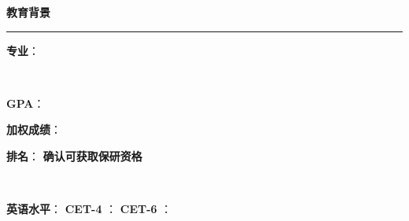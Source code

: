\documentclass[10pt, a4paper, oneside]{ctexart}
\begin{document}
\ifdefined\educationBackground
\begin{minipage}{1\textwidth}
    \large{\ifdefined\showIcon \makebox[\iconAlignWide][c]{\faGraduationCap} \fi \textbf{教育背景}}
\end{minipage}
\rule{\linewidth}{\lineSize}
\begin{center}
    \begin{minipage}{0.9\textwidth}
        \begin{minipage}{0.6\linewidth}
            \university
            \hspace{2em}
            \textbf{\level}
            \hfil
        \end{minipage}
        \begin{minipage}{0.3\linewidth}
            \raggedright
            \textbf{专业}： \major
            \hfil
        \end{minipage} \\[0.5em]
        \begin{minipage}{0.2\linewidth}
            \textbf{GPA}： \gpa \hfil
        \end{minipage}
        \begin{minipage}{0.2\linewidth}
            \textbf{加权成绩}： \grade \hfil
        \end{minipage}
        \begin{minipage}{0.5\linewidth}
            \raggedright
            \textbf{排名}： \rank \ifdefined\qualified \hspace{2em} \textbf{确认可获取保研资格} \fi  \hfil
        \end{minipage} \\[0.5em]
        \ifdefined\showEngLevel
        \begin{minipage}{0.5\linewidth}
            \textbf{英语水平}：
            \hspace{1em}
            \ifdefined\showCETiv
            \textbf{CET-4} \ifdefined\cetIV ： \cetIV \fi \hspace{2em}
            \fi
            \ifdefined\showCETvi
            \textbf{CET-6} \ifdefined\cetVI ： \cetVI \fi \hfil
            \fi
        \end{minipage} \\[0.3em]
        \fi


\end{minipage}
\end{center}
\end{document}
